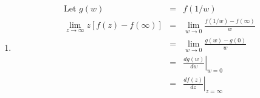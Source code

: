 \documentclass{article}%
\begin{document}
\begin{enumerate}
    \item %
    \begin{eqnarray*}
        \text{Let }g(w) &=& f(1/w) \\
        \lim_{z \to \infty}{z[f(z)-f(\infty)]} &=& \lim_{w \to 0}{\frac{f(1/w)-f(\infty)}{w}} \\
                                               &=& \lim_{w \to 0}{\frac{g(w)-g(0)}{w}} \\
                                               &=& \left. \frac{d g(w)}{dw} \right|_{w=0} \\
                                               &=& \left. \frac{d f(z)}{dz} \right|_{z=\infty}
    \end{eqnarray*}
\end{enumerate}
\end{document}
